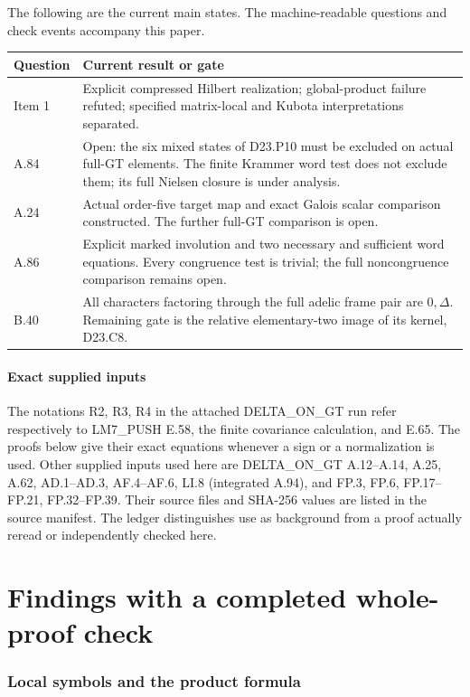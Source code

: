\documentclass[11pt]{article}
\begin{document}
The following are the current main states.  The machine-readable
questions and check events accompany this paper.
\begin{center}\small
\begin{tabular}{p{.12\linewidth}p{.78\linewidth}}
\toprule
Question&Current result or gate\\\midrule
Item 1&Explicit compressed Hilbert realization; global-product
failure refuted; specified matrix-local and Kubota interpretations
separated.\\
A.84&Open: the six mixed states of D23.P10 must be excluded on
actual full-GT elements. The finite Krammer word test does not
exclude them; its full Nielsen closure is under analysis.\\
A.24&Actual order-five target map and exact Galois scalar
comparison constructed. The further full-GT comparison is open.\\
A.86&Explicit marked involution and two necessary and sufficient
word equations. Every congruence test is trivial; the full
noncongruence comparison remains open.\\
B.40&All characters factoring through the full adelic frame pair
are $0,\Delta$. Remaining gate is the relative elementary-two
image of its kernel, D23.C8.\\\bottomrule
\end{tabular}\end{center}

\subsection{Exact supplied inputs}
The notations R2, R3, R4 in the attached DELTA\_ON\_GT run
refer respectively to LM7\_PUSH E.58, the finite covariance
calculation, and E.65.  The proofs below give their exact
equations whenever a sign or a normalization is used.
Other supplied inputs used here are DELTA\_ON\_GT A.12--A.14,
A.25, A.62, AD.1--AD.3, AF.4--AF.6, LI.8 (integrated A.94),
and FP.3, FP.6, FP.17--FP.21, FP.32--FP.39.  Their source
files and SHA-256 values are listed in the source manifest.
The ledger distinguishes use as background from a proof
actually reread or independently checked here.

\part{Findings with a completed whole-proof check}
\section{Local symbols and the product formula}




\end{document}
